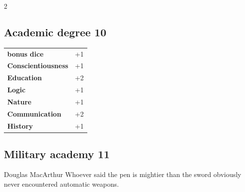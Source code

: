 \begin{multicols}{2}
\begin{tcolorbox}

\end{tcolorbox}

\begin{tcolorbox}
    \subsection*{Academic degree \hfill \small{10 }}
    \tcblower




\begin{tabular}{@{}ll@{}}
    \textbf{bonus dice} & +1\\
    \textbf{Conscientiousness} & +1\\
    \textbf{Education} & +2\\
    \textbf{Logic} & +1\\
    \textbf{Nature} & +1\\
    \textbf{Communication} & +2\\
    \textbf{History} & +1\\
\end{tabular}


\end{tcolorbox}

\begin{tcolorbox}
    \subsection*{Military academy \hfill \small{11 }}
    \tcblower


\begin{pquote}{Douglas MacArthur}
Whoever said the pen is mightier than the sword obviously never encountered automatic weapons.
\end{pquote}


\end{tcolorbox}
\end{multicols}
